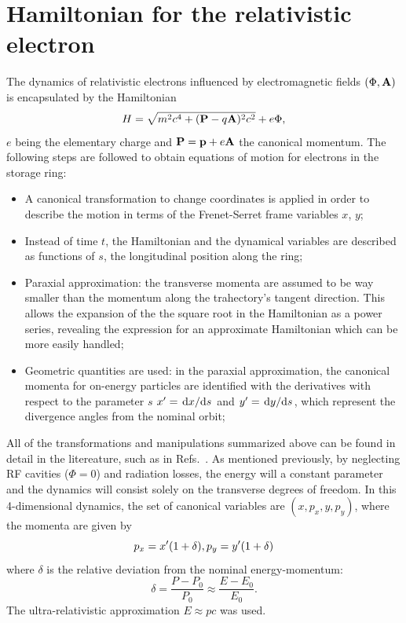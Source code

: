 \section{Hamiltonian for the relativistic electron}
The dynamics of relativistic electrons influenced by electromagnetic fields $(\Phi, \vb{A})$ is encapsulated by the Hamiltonian \cite{landau_classical_1975}
    \begin{equation*}
        H=\sqrt{m^2c^4+(\vb{P}-q\vb{A})^2c^2}+e\Phi,
    \end{equation*}
 $e$ being the elementary charge and $\vb{P}=\vb{p}+e\vb{A}$ the canonical momentum. The following steps are followed to obtain equations of motion for electrons in the storage ring:
 \begin{itemize}
    \item A canonical transformation to change coordinates is applied in order to describe the motion in terms of the Frenet-Serret frame variables $x$, $y$;
    \item Instead of time $t$, the Hamiltonian and the dynamical variables are described as functions of $s$, the longitudinal position along the ring;
    \item Paraxial approximation: the transverse momenta are assumed to be way smaller than the momentum along the trahectory's tangent direction. This allows the expansion of the the square root in the Hamiltonian as a power series, revealing the expression for an approximate Hamiltonian which can be more easily handled;
    \item Geometric quantities are used: in the paraxial approximation, the canonical momenta for on-energy particles are identified with the derivatives with respect to the parameter $s$ $x^\prime = \dv*{x}{s}$ and $y^\prime = \dv*{y}{s}$, which represent the divergence angles from the nominal orbit;
 \end{itemize}
 All of the transformations and manipulations summarized above can be found in detail in the litereature, such as in Refs.~\cite{lee_accelerator_2004, wiedemann_particle_2015,  wolski_beam_2014}. As mentioned previously, by neglecting RF cavities ($\Phi=0$) and radiation losses, the energy will a constant parameter and the dynamics will consist solely on the transverse degrees of freedom.  In this 4-dimensional dynamics, the set of canonical variables are $(x,p_{x},y , p_{y})$, where the momenta are given by
\begin{equation} p_{x}= x^\prime(1+\delta),\quad \\p_{y}=y^\prime (1+\delta)\end{equation}
where $\delta$ is the relative deviation from the nominal energy-momentum:
\begin{equation}
    \delta = \frac{P-P_{0}}{P_{0}}\approx\frac{E-E_0}{E_0}.
\end{equation}
The ultra-relativistic approximation $E\approx pc$ was used.

